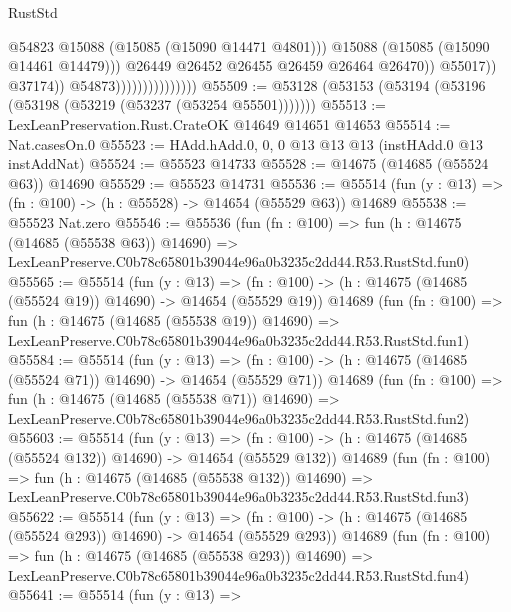 \begin{lexlean}{RustStd}
\begin{coremodule}
                                                  @54823
                                                  @15088
                                                  (@15085 (@15090 @14471 @4801)))
                                                @15088
                                                (@15085 (@15090 @14461 @14479)))
                                              @26449
                                              @26452
                                              @26455
                                              @26459
                                              @26464
                                              @26470))
                                          @55017))
                                      @37174))
                                  @54873)))))))))))))))
@55509 := @53128 (@53153 (@53194 (@53196 (@53198 (@53219 (@53237 (@53254 @55501)))))))
@55513 := LexLeanPreservation.Rust.CrateOK @14649 @14651 @14653
@55514 := Nat.casesOn.{0}
@55523 := HAdd.hAdd.{0, 0, 0} @13 @13 @13 (instHAdd.{0} @13 instAddNat)
@55524 := @55523 @14733
@55528 := @14675 (@14685 (@55524 @63)) @14690
@55529 := @55523 @14731
@55536 := @55514 (fun (y : @13) => (fn : @100) -> (h : @55528) -> @14654 (@55529 @63)) @14689
@55538 := @55523 Nat.zero
@55546 := @55536
    (fun (fn : @100) =>
    fun (h : @14675 (@14685 (@55538 @63)) @14690) =>
    LexLeanPreserve.C0b78c65801b39044e96a0b3235c2dd44.R53.RustStd.fun0)
@55565 := @55514
    (fun (y : @13) =>
    (fn : @100) -> (h : @14675 (@14685 (@55524 @19)) @14690) -> @14654 (@55529 @19))
    @14689
    (fun (fn : @100) =>
    fun (h : @14675 (@14685 (@55538 @19)) @14690) =>
    LexLeanPreserve.C0b78c65801b39044e96a0b3235c2dd44.R53.RustStd.fun1)
@55584 := @55514
    (fun (y : @13) =>
    (fn : @100) -> (h : @14675 (@14685 (@55524 @71)) @14690) -> @14654 (@55529 @71))
    @14689
    (fun (fn : @100) =>
    fun (h : @14675 (@14685 (@55538 @71)) @14690) =>
    LexLeanPreserve.C0b78c65801b39044e96a0b3235c2dd44.R53.RustStd.fun2)
@55603 := @55514
    (fun (y : @13) =>
    (fn : @100) -> (h : @14675 (@14685 (@55524 @132)) @14690) -> @14654 (@55529 @132))
    @14689
    (fun (fn : @100) =>
    fun (h : @14675 (@14685 (@55538 @132)) @14690) =>
    LexLeanPreserve.C0b78c65801b39044e96a0b3235c2dd44.R53.RustStd.fun3)
@55622 := @55514
    (fun (y : @13) =>
    (fn : @100) -> (h : @14675 (@14685 (@55524 @293)) @14690) -> @14654 (@55529 @293))
    @14689
    (fun (fn : @100) =>
    fun (h : @14675 (@14685 (@55538 @293)) @14690) =>
    LexLeanPreserve.C0b78c65801b39044e96a0b3235c2dd44.R53.RustStd.fun4)
@55641 := @55514
    (fun (y : @13) =>

\end{coremodule}
\end{lexlean}
